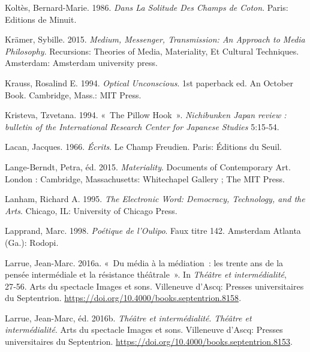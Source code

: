 \begin{CSLReferences}{1}{0}
\leavevmode{}%
Koltès, Bernard-Marie. 1986. \emph{Dans La Solitude Des Champs de
Coton}. {Paris}: {Editions de Minuit}.

\leavevmode{}%
Krämer, Sybille. 2015. \emph{Medium, {Messenger}, {Transmission}: An
{Approach} to {Media Philosophy}}. Recursions: Theories of Media,
Materiality, Et Cultural Techniques. {Amsterdam}: {Amsterdam university
press}.

\leavevmode{}%
Krauss, Rosalind E. 1994. \emph{Optical {Unconscious}}. 1st paperback
ed. An {October} Book. {Cambridge, Mass.}: {MIT Press}.

\leavevmode{}%
Kristeva, Tzvetana. 1994. {«~The {Pillow Hook}~»}. \emph{Nichibunken
Japan review : bulletin of the International Research Center for
Japanese Studies} 5:15‑54.

\leavevmode{}%
Lacan, Jacques. 1966. \emph{{É}crits}. Le {Champ} Freudien. {Paris}:
{{É}ditions du Seuil}.

\leavevmode{}%
Lange-Berndt, Petra, éd. 2015. \emph{Materiality}. Documents of
Contemporary Art. {London : Cambridge, Massachusetts}: {Whitechapel
Gallery ; The MIT Press}.

\leavevmode{}%
Lanham, Richard A. 1995. \emph{The {Electronic Word}: {Democracy},
{Technology}, and the {Arts}}. {Chicago, IL}: {University of Chicago
Press}.

\leavevmode{}%
Lapprand, Marc. 1998. \emph{{Po{é}tique de l'Oulipo}}. {Faux titre} 142.
{Amsterdam Atlanta (Ga.)}: {Rodopi}.

\leavevmode{}%
Larrue, Jean-Marc. 2016a. {«~{Du m{é}dia {à} la m{é}diation~: les trente
ans de la pens{é}e interm{é}diale et la r{é}sistance th{é}{â}trale}~»}.
In \emph{{Th{é}{â}tre et interm{é}dialit{é}}}, 27‑56. {Arts du spectacle
{\textendash} Images et sons}. {Villeneuve d'Ascq}: {Presses
universitaires du Septentrion}.
\url{https://doi.org/10.4000/books.septentrion.8158}.

\leavevmode{}%
Larrue, Jean-Marc, éd. 2016b. \emph{{Th{é}{â}tre et
interm{é}dialit{é}}}. \emph{Th{é}{â}tre et interm{é}dialit{é}}. {Arts du
spectacle {\textendash} Images et sons}. {Villeneuve d'Ascq}: {Presses
universitaires du Septentrion}.
\url{https://doi.org/10.4000/books.septentrion.8153}.


\end{CSLReferences}
